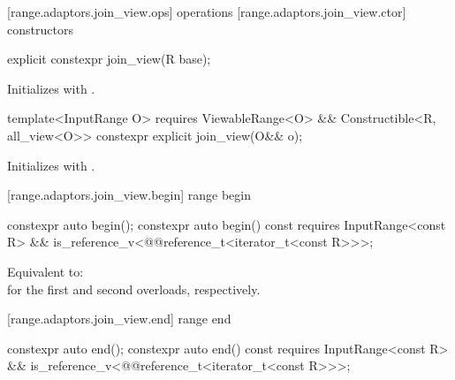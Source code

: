 [range.adaptors.join_view.ops]{ operations}
[range.adaptors.join_view.ctor]{ constructors}

%
\begin{itemdecl}
explicit constexpr join_view(R base);
\end{itemdecl}

\begin{itemdescr}
\pnum
\effects Initializes  with .
\end{itemdescr}

%
\begin{itemdecl}
template<InputRange O>
  requires ViewableRange<O> && Constructible<R, all_view<O>>
constexpr explicit join_view(O&& o);
\end{itemdecl}

\begin{itemdescr}
\pnum
\effects Initializes  with .
\end{itemdescr}

[range.adaptors.join_view.begin]{ range begin}

%
\begin{itemdecl}
constexpr auto begin();
constexpr auto begin() const requires InputRange<const R> &&
  is_reference_v<@@reference_t<iterator_t<const R>>>;
\end{itemdecl}

\begin{itemdescr}
\pnum
\effects Equivalent to:
 \\
for the first and second overloads, respectively.
\end{itemdescr}

[range.adaptors.join_view.end]{ range end}

%
\begin{itemdecl}
constexpr auto end();
constexpr auto end() const requires InputRange<const R> &&
  is_reference_v<@@reference_t<iterator_t<const R>>>;
\end{itemdecl}

